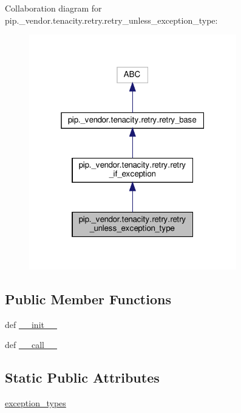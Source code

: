 Collaboration diagram for pip.\+\_\+vendor.\+tenacity.\+retry.\+retry\+\_\+unless\+\_\+exception\+\_\+type\+:
\nopagebreak
\begin{figure}[H]
\begin{center}
\leavevmode
\includegraphics[width=256pt]{classpip_1_1__vendor_1_1tenacity_1_1retry_1_1retry__unless__exception__type__coll__graph}
\end{center}
\end{figure}
\subsection*{Public Member Functions}
\begin{DoxyCompactItemize}
\item 
def \hyperlink{classpip_1_1__vendor_1_1tenacity_1_1retry_1_1retry__unless__exception__type_ad74430492685fd2faf870566cf5e9ac7}{\+\_\+\+\_\+init\+\_\+\+\_\+}
\item 
def \hyperlink{classpip_1_1__vendor_1_1tenacity_1_1retry_1_1retry__unless__exception__type_a8d59fa70212fe68b17c97bc9359d6ae7}{\+\_\+\+\_\+call\+\_\+\+\_\+}
\end{DoxyCompactItemize}
\subsection*{Static Public Attributes}
\begin{DoxyCompactItemize}
\item 
\hyperlink{classpip_1_1__vendor_1_1tenacity_1_1retry_1_1retry__unless__exception__type_a6435cde0125c609b4e1227ccffdc417c}{exception\+\_\+types}
\end{DoxyCompactItemize}

